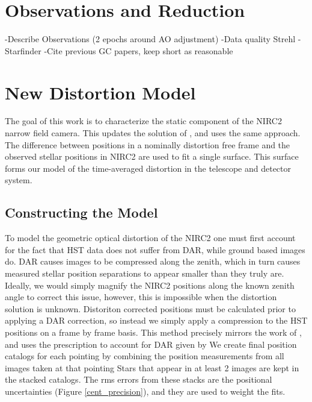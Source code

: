 \section{Observations and Reduction}
-Describe Observations (2 epochs around AO adjustment)
-Data quality Strehl
-Starfinder
-Cite previous GC papers, keep short as reasonable

\section{New Distortion Model}
The goal of this work is to characterize the static component of the NIRC2 narrow field camera.  This updates the solution of \cite{Yelda_2010}, and uses the same approach.  The difference between positions in a nominally distortion free frame and the observed stellar positions in NIRC2 are used to fit a single surface.  This surface forms our model of the time-averaged distortion  in the telescope and detector system.

\subsection{Constructing the Model}
To model the geometric optical distortion of the NIRC2 one must first account for the fact that HST data does not suffer from DAR, while ground based images do.  DAR causes images to be compressed along the zenith, which in turn causes measured stellar position separations to appear smaller than they truly are.  Ideally, we would simply magnify the NIRC2 positions along the known zenith angle to correct this issue, however,  this is impossible when the distortion solution is unknown.  Distoriton corrected positions must be calculated prior to applying a DAR correction, so instead we simply apply a compression to the HST positions on a frame by frame basis. This method precisely mirrors the work of \cite{Yelda_2010}, and uses the prescription to account for DAR given by \cite{Gubler}
We create final position catalogs for each pointing by combining the position measurements from all images taken at that pointing  Stars that appear in at least 2 images are kept in the stacked catalogs.  The rms errors from these stacks are the positional uncertainties (Figure \ref{cent_precision}), and they are used to weight the fits.

